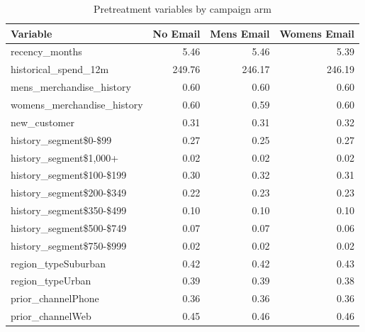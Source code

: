 \begin{table}

\caption{\label{tab:pretreatment}Pretreatment variables by campaign arm}
\centering
\begin{tabular}[t]{lrrr}
\toprule
Variable & No Email & Mens Email & Womens Email\\
\midrule
recency\_months & 5.46 & 5.46 & 5.39\\
historical\_spend\_12m & 249.76 & 246.17 & 246.19\\
mens\_merchandise\_history & 0.60 & 0.60 & 0.60\\
womens\_merchandise\_history & 0.60 & 0.59 & 0.60\\
new\_customer & 0.31 & 0.31 & 0.32\\
\addlinespace
history\_segment\$0-\$99 & 0.27 & 0.25 & 0.27\\
history\_segment\$1,000+ & 0.02 & 0.02 & 0.02\\
history\_segment\$100-\$199 & 0.30 & 0.32 & 0.31\\
history\_segment\$200-\$349 & 0.22 & 0.23 & 0.23\\
history\_segment\$350-\$499 & 0.10 & 0.10 & 0.10\\
\addlinespace
history\_segment\$500-\$749 & 0.07 & 0.07 & 0.06\\
history\_segment\$750-\$999 & 0.02 & 0.02 & 0.02\\
region\_typeSuburban & 0.42 & 0.42 & 0.43\\
region\_typeUrban & 0.39 & 0.39 & 0.38\\
prior\_channelPhone & 0.36 & 0.36 & 0.36\\
\addlinespace
prior\_channelWeb & 0.45 & 0.46 & 0.46\\
\bottomrule
\end{tabular}
\end{table}
